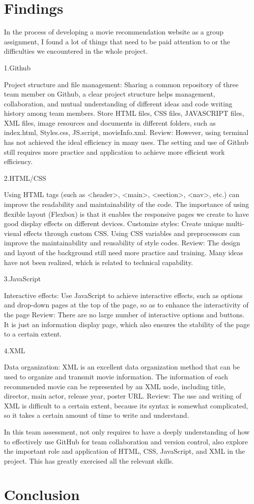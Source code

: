 \documentclass{article}
\begin{document}
\section{Findings}

In the process of developing a movie recommendation website as a group assignment, I found a lot of things that need to be paid attention to or the difficulties we encountered in the whole project.

1.Github

Project structure and file management: Sharing a common repository of three team member on Github, a clear project structure helps management, collaboration, and mutual understanding of different ideas and code writing history among team members. Store HTML files, CSS files, JAVASCRIPT files, XML files, image resources and documents in different folders, such as index.html, Styles.css, JS.script, movieInfo.xml.
Review: However, using terminal has not achieved the ideal efficiency in many uses. The setting and use of Github still requires more practice and application to achieve more efficient work efficiency.

2.HTML/CSS

Using HTML tags (such as <header>, <main>, <section>, <nav>, etc.) can improve the readability and maintainability of the code.
The importance of using flexible layout (Flexbox) is that it enables the responsive pages we create to have good display effects on different devices.
Customize styles: Create unique multi-visual effects through custom CSS. Using CSS variables and preprocessors can improve the maintainability and reusability of style codes.
Review: The design and layout of the background still need more practice and training. Many ideas have not been realized, which is related to technical capability.

3.JavaScript

Interactive effects: Use JavaScript to achieve interactive effects, such as options and drop-down pages at the top of the page, so as to enhance the interactivity of the page
Review: There are no large number of interactive options and buttons. It is just an information display page, which also ensures the stability of the page to a certain extent.

4.XML

Data organization: XML is an excellent data organization method that can be used to organize and transmit movie information. The information of each recommended movie can be represented by an XML node, including title, director, main actor, release year, poster URL.
Review: The use and writing of XML is difficult to a certain extent, because its syntax is somewhat complicated, so it takes a certain amount of time to write and understand.

In this team assessment, not only requires to have a deeply understanding of how to effectively use GitHub for team collaboration and version control,  also explore the important role and application of HTML, CSS, JavaScript, and XML in the project. This has greatly exercised all the relevant skills.

    
\section{Conclusion}
\end{document}
